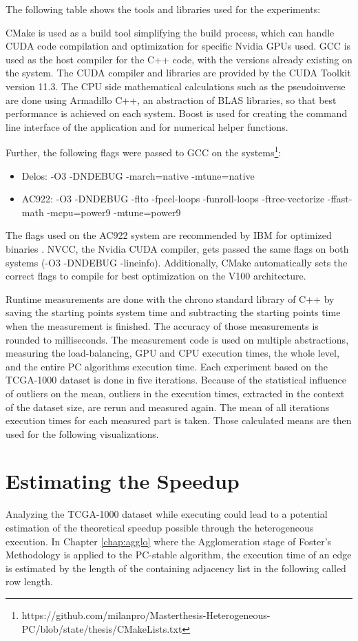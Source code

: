 The following table shows the tools and libraries used for the experiments:


CMake is used as a build tool simplifying the build process, which can handle CUDA code compilation and optimization for specific Nvidia GPUs used. GCC is used as the host compiler for the C++ code, with the versions already existing on the system. The CUDA compiler and libraries are provided by the CUDA Toolkit version 11.3. The CPU side mathematical calculations such as the pseudoinverse are done using Armadillo C++, an abstraction of BLAS libraries, so that best performance is achieved on each system. Boost is used for creating the command line interface of the application and for numerical helper functions.

Further, the following flags were passed to GCC on the systems\footnote{https://github.com/milanpro/Masterthesis-Heterogeneous-PC/blob/state/thesis/CMakeLists.txt}:
\begin{itemize}
  \item Delos: -O3 -DNDEBUG -march=native -mtune=native
  \item AC922: -O3 -DNDEBUG -flto -fpeel-loops -funroll-loops -ftree-vectorize -ffast-math -mcpu=power9 -mtune=power9
\end{itemize}
The flags used on the AC922 system are recommended by IBM for optimized binaries \cite{LinuxIBMPower}. NVCC, the Nvidia CUDA compiler, gets passed the same flags on both systems (-O3 -DNDEBUG -lineinfo). Additionally, CMake automatically sets the correct flags to compile for best optimization on the V100 architecture.

Runtime measurements are done with the chrono standard library of C++ by saving the starting points system time and subtracting the starting points time when the measurement is finished. The accuracy of those measurements is rounded to milliseconds. The measurement code is used on multiple abstractions, measuring the load-balancing, GPU and CPU execution times, the whole level, and the entire PC algorithms execution time.
Each experiment based on the TCGA-1000 dataset is done in five iterations.  Because of the statistical influence of outliers on the mean, outliers in the execution times, extracted in the context of the dataset size, are rerun and measured again. The mean of all iterations execution times for each measured part is taken. Those calculated means are then used for the following visualizations.

\section{Estimating the Speedup}
\label{chap:est_speedup}
Analyzing the TCGA-1000 dataset while executing could lead to a potential estimation of the theoretical speedup possible through the heterogeneous execution. In Chapter \ref{chap:agglo} where the Agglomeration stage of Foster's Methodology \cite{fosterDesigningBuildingParallel1995} is applied to the PC-stable algorithm, the execution time of an edge is estimated by the length of the containing adjacency list in the following called row length.

